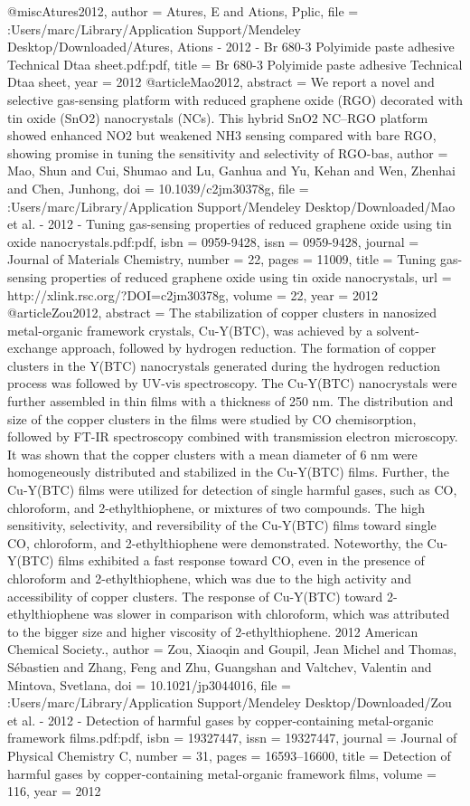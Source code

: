 @misc{Atures2012,
author = {Atures, E and Ations, Pplic},
file = {:Users/marc/Library/Application Support/Mendeley Desktop/Downloaded/Atures, Ations - 2012 - Br 680-3 Polyimide paste adhesive Technical Dtaa sheet.pdf:pdf},
title = {{Br 680-3 Polyimide paste adhesive Technical Dtaa sheet}},
year = {2012}
}
@article{Mao2012,
abstract = {We report a novel and selective gas-sensing platform with reduced graphene oxide (RGO) decorated with tin oxide (SnO2) nanocrystals (NCs). This hybrid SnO2 NC–RGO platform showed enhanced NO2 but weakened NH3 sensing compared with bare RGO, showing promise in tuning the sensitivity and selectivity of RGO-bas},
author = {Mao, Shun and Cui, Shumao and Lu, Ganhua and Yu, Kehan and Wen, Zhenhai and Chen, Junhong},
doi = {10.1039/c2jm30378g},
file = {:Users/marc/Library/Application Support/Mendeley Desktop/Downloaded/Mao et al. - 2012 - Tuning gas-sensing properties of reduced graphene oxide using tin oxide nanocrystals.pdf:pdf},
isbn = {0959-9428},
issn = {0959-9428},
journal = {Journal of Materials Chemistry},
number = {22},
pages = {11009},
title = {{Tuning gas-sensing properties of reduced graphene oxide using tin oxide nanocrystals}},
url = {http://xlink.rsc.org/?DOI=c2jm30378g},
volume = {22},
year = {2012}
}
@article{Zou2012,
abstract = {The stabilization of copper clusters in nanosized metal-organic framework crystals, Cu-Y(BTC), was achieved by a solvent-exchange approach, followed by hydrogen reduction. The formation of copper clusters in the Y(BTC) nanocrystals generated during the hydrogen reduction process was followed by UV-vis spectroscopy. The Cu-Y(BTC) nanocrystals were further assembled in thin films with a thickness of 250 nm. The distribution and size of the copper clusters in the films were studied by CO chemisorption, followed by FT-IR spectroscopy combined with transmission electron microscopy. It was shown that the copper clusters with a mean diameter of 6 nm were homogeneously distributed and stabilized in the Cu-Y(BTC) films. Further, the Cu-Y(BTC) films were utilized for detection of single harmful gases, such as CO, chloroform, and 2-ethylthiophene, or mixtures of two compounds. The high sensitivity, selectivity, and reversibility of the Cu-Y(BTC) films toward single CO, chloroform, and 2-ethylthiophene were demonstrated. Noteworthy, the Cu-Y(BTC) films exhibited a fast response toward CO, even in the presence of chloroform and 2-ethylthiophene, which was due to the high activity and accessibility of copper clusters. The response of Cu-Y(BTC) toward 2-ethylthiophene was slower in comparison with chloroform, which was attributed to the bigger size and higher viscosity of 2-ethylthiophene. {\textcopyright} 2012 American Chemical Society.},
author = {Zou, Xiaoqin and Goupil, Jean Michel and Thomas, S{\'{e}}bastien and Zhang, Feng and Zhu, Guangshan and Valtchev, Valentin and Mintova, Svetlana},
doi = {10.1021/jp3044016},
file = {:Users/marc/Library/Application Support/Mendeley Desktop/Downloaded/Zou et al. - 2012 - Detection of harmful gases by copper-containing metal-organic framework films.pdf:pdf},
isbn = {19327447},
issn = {19327447},
journal = {Journal of Physical Chemistry C},
number = {31},
pages = {16593--16600},
title = {{Detection of harmful gases by copper-containing metal-organic framework films}},
volume = {116},
year = {2012}
}
